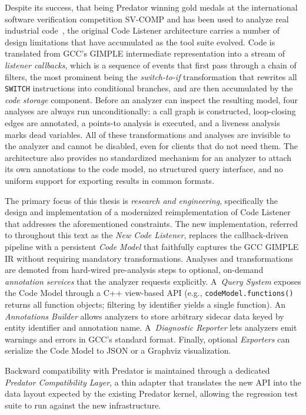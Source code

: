 Despite its success, that being Predator winning gold medals at the international software verification competition SV-COMP and has been used to analyze real industrial code~\cite{CodeListener2012}, the original Code Listener architecture carries a number of design limitations that have accumulated as the tool suite evolved. Code is translated from GCC's GIMPLE intermediate representation into a stream of \emph{listener callbacks}, which is a sequence of events that first pass through a chain of filters, the most prominent being the \emph{switch-to-if} transformation that rewrites all \texttt{SWITCH} instructions into conditional branches, and are then accumulated by the \emph{code storage} component. Before an analyzer can inspect the resulting model, four analyses are always run unconditionally: a call graph is constructed, loop-closing edges are annotated, a points-to analysis is executed, and a liveness analysis marks dead variables. All of these transformations and analyses are invisible to the analyzer and cannot be disabled, even for clients that do not need them. The architecture also provides no standardized mechanism for an analyzer to attach its own annotations to the code model, no structured query interface, and no uniform support for exporting results in common formats.

The primary focus of this thesis is \emph{research and engineering}, specifically the design and implementation of a modernized reimplementation of Code Listener that addresses the aforementioned constraints. The new implementation, referred to throughout this text as the \emph{New Code Listener}, replaces the callback-driven pipeline with a persistent \emph{Code Model} that faithfully captures the GCC GIMPLE IR without requiring mandatory transformations. Analyses and transformations are demoted from hard-wired pre-analysis steps to optional, on-demand \emph{annotation services} that the analyzer requests explicitly. A~\emph{Query System} exposes the Code Model through a C++ view-based API (e.g., \texttt{codeModel.functions()} returns all function objects; filtering by identifier yields a single function). An \emph{Annotations Builder} allows analyzers to store arbitrary sidecar data keyed by entity identifier and annotation name. A~\emph{Diagnostic Reporter} lets analyzers emit warnings and errors in GCC's standard format. Finally, optional \emph{Exporters} can serialize the Code Model to JSON or a Graphviz visualization.

Backward compatibility with Predator is maintained through a dedicated \emph{Predator Compatibility Layer}, a thin adapter that translates the new API into the data layout expected by the existing Predator kernel, allowing the regression test suite to run against the new infrastructure.

